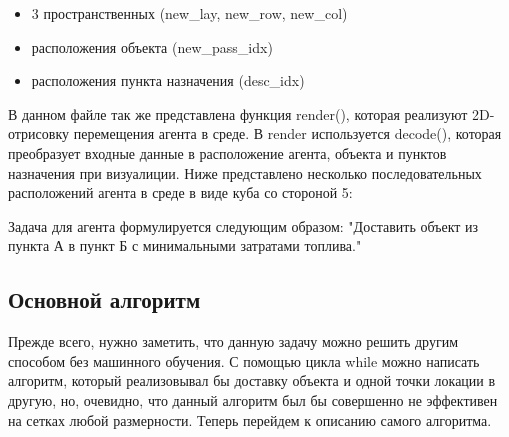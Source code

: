 \documentclass[12pt, a4paper]{report}
\theoremstyle{definition}
\theoremstyle{plain}
\theoremstyle{remark}
\theoremstyle{remark}
\theoremstyle{definition}
\begin{document}
\begin{itemize}
    \item 3 пространственных (new\_lay, new\_row, new\_col)
    \item расположения объекта (new\_pass\_idx)
    \item расположения пункта назначения (desc\_idx)
\end{itemize}
В данном файле так же представлена функция render(), которая реализуют 2D-отрисовку перемещения агента в среде. В render используется decode(), которая преобразует входные данные в расположение агента, объекта и пунктов назначения при визуалиции. Ниже представлено несколько последовательных расположений агента в среде в виде куба со стороной 5:

Задача для агента формулируется следующим образом: "Доставить объект из пункта А в пункт Б с минимальными затратами топлива."

\subsection{Основной алгоритм}

Прежде всего, нужно заметить, что данную задачу можно решить другим способом без машинного обучения. С помощью цикла while можно написать алгоритм, который реализовывал бы доставку объекта и одной точки локации в другую, но, очевидно, что данный алгоритм был бы совершенно не эффективен на сетках любой размерности. Теперь перейдем к описанию самого алгоритма. \\
\end{document}
